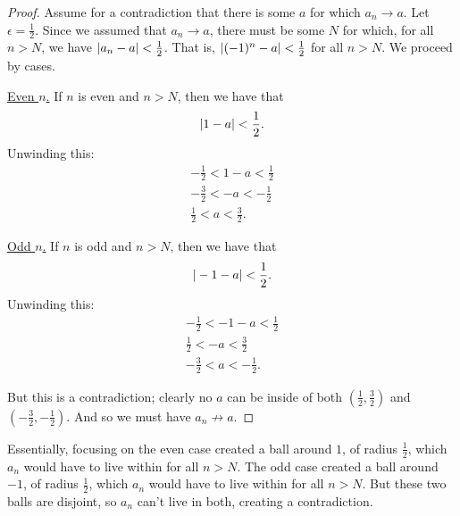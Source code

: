 \begin{example}
  \begin{proof}
    Assume for a contradiction that there is
    some $a$ for which $a_n \to a$.
    Let $\epsilon = \frac{1}{2}$. Since we assumed that $a_n \to a$,
    there must be some $N$ for which, for all $n > N$, we have
    $| a_n - a | < \frac{1}{2}$. That is, $| (-1)^n - a | <
    \frac{1}{2}$ for all $n > N$. We proceed by cases.

    \underline{Even $n$.} If $n$ is even and $n > N$, then we have that
    \[ | 1 - a | < \frac{1}{2}. \]
    Unwinding this:
    \begin{gather*}
      -\frac{1}{2} < 1 - a < \frac{1}{2} \\
      -\frac{3}{2} < -a < -\frac{1}{2} \\
      \frac{1}{2} < a < \frac{3}{2}.
    \end{gather*}

    \underline{Odd $n$.} If $n$ is odd and $n > N$, then we have that
    \[ | -1 - a | < \frac{1}{2}. \]
    Unwinding this:
    \begin{gather*}
      -\frac{1}{2} < -1 - a < \frac{1}{2} \\
      \frac{1}{2} < -a < \frac{3}{2} \\
      -\frac{3}{2} < a < -\frac{1}{2}.
    \end{gather*}

    But this is a contradiction; clearly no $a$ can be inside of both
    $\left(\frac{1}{2}, \frac{3}{2}\right)$ and $\left(-\frac{3}{2},
    -\frac{1}{2}\right)$.
    And so we must have $a_n \not\to a$.
  \end{proof}

  Essentially, focusing on the even case created a ball around $1$,
  of radius $\frac{1}{2}$, which $a_n$ would have to live within
  for all $n > N$.
  The odd case created a ball around $-1$, of radius $\frac{1}{2}$,
  which $a_n$ would have to live within for all $n > N$.
  But these two balls are disjoint, so $a_n$ can't live in both,
  creating a contradiction.

  \begin{tightfigure}
    \centering
\end{tightfigure}
\end{example}
